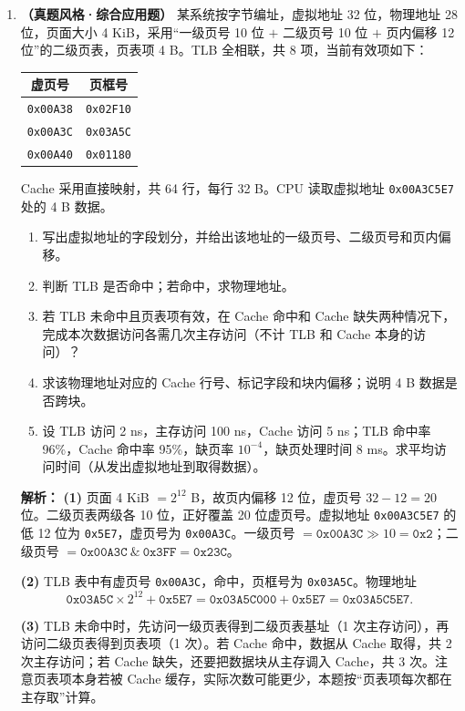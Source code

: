 \begin{enumerate}[resume]
\item \textbf{（真题风格·综合应用题）} 某系统按字节编址，虚拟地址 32 位，物理地址 28 位，页面大小 4 KiB，采用“一级页号 10 位 $+$ 二级页号 10 位 $+$ 页内偏移 12 位”的二级页表，页表项 4 B。TLB 全相联，共 8 项，当前有效项如下：
\begin{center}
\small
\begin{tabular}{|c|c|}
\hline
虚页号 & 页框号 \\
\hline
\texttt{0x00A38} & \texttt{0x02F10} \\
\texttt{0x00A3C} & \texttt{0x03A5C} \\
\texttt{0x00A40} & \texttt{0x01180} \\
\hline
\end{tabular}
\end{center}
Cache 采用直接映射，共 64 行，每行 32 B。CPU 读取虚拟地址 \texttt{0x00A3C5E7} 处的 4 B 数据。
\begin{enumerate}
\item[(1)] 写出虚拟地址的字段划分，并给出该地址的一级页号、二级页号和页内偏移。
\item[(2)] 判断 TLB 是否命中；若命中，求物理地址。
\item[(3)] 若 TLB 未命中且页表项有效，在 Cache 命中和 Cache 缺失两种情况下，完成本次数据访问各需几次主存访问（不计 TLB 和 Cache 本身的访问）？
\item[(4)] 求该物理地址对应的 Cache 行号、标记字段和块内偏移；说明 4 B 数据是否跨块。
\item[(5)] 设 TLB 访问 2 ns，主存访问 100 ns，Cache 访问 5 ns；TLB 命中率 96\%，Cache 命中率 95\%，缺页率 $10^{-4}$，缺页处理时间 8 ms。求平均访问时间（从发出虚拟地址到取得数据）。
\end{enumerate}

\ifshowsolutions\par\noindent\textbf{解析：}
\textbf{(1)} 页面 4 KiB $=2^{12}$ B，故页内偏移 12 位，虚页号 $32-12=20$ 位。二级页表两级各 10 位，正好覆盖 20 位虚页号。虚拟地址 \texttt{0x00A3C5E7} 的低 12 位为 \texttt{0x5E7}，虚页号为 \texttt{0x00A3C}。一级页号 $=\texttt{0x00A3C}\gg10=\texttt{0x2}$；二级页号 $=\texttt{0x00A3C}\ \&\ \texttt{0x3FF}=\texttt{0x23C}$。

\textbf{(2)} TLB 表中有虚页号 \texttt{0x00A3C}，命中，页框号为 \texttt{0x03A5C}。物理地址
\[
\texttt{0x03A5C}\times 2^{12}+\texttt{0x5E7}
=\texttt{0x03A5C000}+\texttt{0x5E7}
=\texttt{0x03A5C5E7}.
\]

\textbf{(3)} TLB 未命中时，先访问一级页表得到二级页表基址（1 次主存访问），再访问二级页表得到页表项（1 次）。若 Cache 命中，数据从 Cache 取得，共 2 次主存访问；若 Cache 缺失，还要把数据块从主存调入 Cache，共 3 次。注意页表项本身若被 Cache 缓存，实际次数可能更少，本题按“页表项每次都在主存取”计算。


\end{enumerate}
